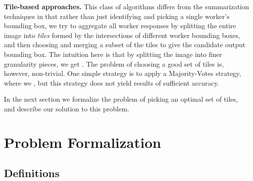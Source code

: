 \documentclass[letterpaper]{article} %
\begin{document}
\smallskip
\noindent
{\bf Tile-based approaches.}
This class of algorithms differs from the summarization techniques in that rather than just identifying and picking a single worker's bounding box, we try to aggregate all worker responses by splitting the entire image into {\em tiles} formed by the intersections of different worker bounding boxes, and then choosing and merging a subset of the tiles to give the candidate output bounding box. The intuition here is that by splitting the image into finer granularity pieces, we get . The problem of choosing a good set of tiles is, however, non-trivial.
One simple strategy is to apply a Majority-Votes strategy, where we , but this strategy does not yield results of sufficient accuracy. 

In the next section we formalize the problem of picking an optimal set of tiles, and describe our solution to this problem.


\section{Problem Formalization}
\subsection{Definitions}
\end{document}
